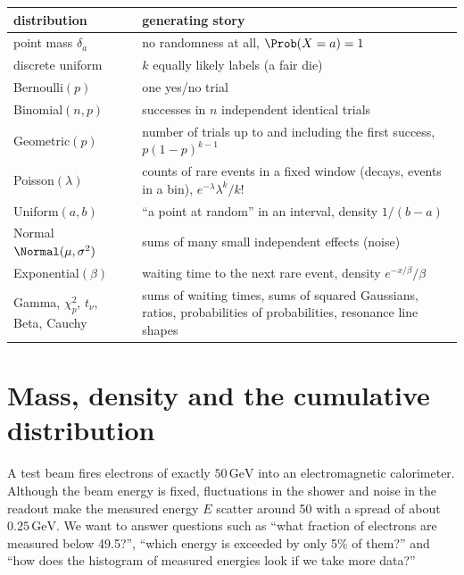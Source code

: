 \begin{taxonomy}
\begin{center}
\small
\begin{tabular}{@{}p{3.2cm}p{9.2cm}@{}}
\toprule
distribution & generating story\\\midrule
point mass $\delta_a$ & no randomness at all, $\Prob(X=a)=1$\\
discrete uniform & $k$ equally likely labels (a fair die)\\
Bernoulli$(p)$ & one yes/no trial\\
Binomial$(n,p)$ & successes in $n$ independent identical trials\\
Geometric$(p)$ & number of trials up to and including the first success, $p(1-p)^{k-1}$\\
Poisson$(\lambda)$ & counts of rare events in a fixed window (decays, events in a bin), $e^{-\lambda}\lambda^k/k!$\\
Uniform$(a,b)$ & ``a point at random'' in an interval, density $1/(b-a)$\\
Normal $\Normal(\mu,\sigma^2)$ & sums of many small independent effects (noise)\\
Exponential$(\beta)$ & waiting time to the next rare event, density $e^{-x/\beta}/\beta$\\
Gamma, $\chi^2_p$, $t_\nu$, Beta, Cauchy & sums of waiting times, sums of squared Gaussians, ratios, probabilities of probabilities, resonance line shapes\\
\bottomrule
\end{tabular}
\end{center}
\end{taxonomy}

\section{Mass, density and the cumulative distribution}
\label{1b:sec:pdf}

A test beam fires electrons of exactly $50\,\mathrm{GeV}$ into an
electromagnetic calorimeter. Although the beam energy is fixed, fluctuations in the shower and noise in
the readout make the measured energy $E$ scatter around 50 with a spread of
about $0.25\,\mathrm{GeV}$. We want to
answer questions such as ``what fraction of electrons are measured below
49.5?'', ``which energy is exceeded by only 5\% of them?'' and ``how does the
histogram of measured energies look if we take more data?''

